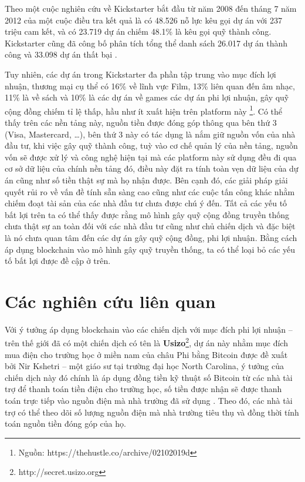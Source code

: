\documentclass[../main-report.tex]{subfiles}
\begin{document}
Theo một cuộc nghiên cứu về Kickstarter bắt đầu từ năm 2008 đến tháng 7 năm 2012 của một cuộc điều tra kết quả là có 48.526 nỗ lực kêu gọi dự án với 237 triệu cam kết, và có 23.719 dự án chiếm 48.1\% là kêu gọi quỹ thành công. Kickstarter cũng đã công bố phân tích tổng thể danh sách 26.017 dự án thành công và 33.098 dự án thất bại \cite{mollick2014dynamics}.

Tuy nhiên, các dự án trong Kickstarter đa phần tập trung vào mục đích lợi nhuận, thương mại cụ thể có 16\% về lĩnh vực Film, 13\% liên quan đến âm nhạc, 11\% là về sách và 10\% là các dự án về games các dự án phi lợi nhuận, gây quỹ cộng đồng chiếm tỉ lệ thấp, hầu như ít xuất hiện trên platform này \footnote{Nguồn: https://thehustle.co/archive/02102019d}. Có thể thấy trên các nền tảng này, nguồn tiền được đóng góp thông qua bên thứ 3 (Visa, Mastercard, \ldots), bên thứ 3 này có tác dụng là nắm giữ nguồn vốn của nhà đầu tư, khi việc gây quỹ thành công, tuỳ vào cơ chế quản lý của nền tảng, nguồn vốn sẽ được xử lý và công nghệ hiện tại mà các platform này sử dụng đều đi qua cơ sở dữ liệu của chính nền tảng đó, điều này đặt ra tính toàn vẹn dữ liệu của dự án cũng như số tiền thật sự mà họ nhận được. Bên cạnh đó, các giải pháp giải quyết rủi ro về vấn đề tính sẵn sàng cao cũng như các cuộc tấn công khác nhằm chiếm đoạt tài sản của các nhà đầu tư chưa được chú ý đến. Tất cả các yếu tố bất lợi trên ta có thể thấy được rằng mô hình gây quỹ cộng đồng truyền thống chưa thật sự an toàn đối với các nhà đầu tư cũng như chủ chiến dịch và đặc biệt là nó chưa quan tâm đến các dự án gây quỹ cộng đồng, phi lợi nhuận. Bằng cách áp dụng blockchain vào mô hình gây quỹ truyền thống, ta có thể loại bỏ các yếu tố bất lợi được đề cập ở trên.
\section{Các nghiên cứu liên quan}
\label{sec:related-work}
Với ý tưởng áp dụng \gls{blockchain} vào các chiến dịch với mục đích phi lợi nhuận – trên thế giới đã có một chiến dịch có tên là \textbf{Usizo}\footnote{http://secret.usizo.org}, dự án này nhằm mục đích mua điện cho trường học ở miền nam của châu Phi bằng Bitcoin  được đề xuất bởi Nir Kshetri – một giáo sư tại trường đại học North Carolina, ý tưởng của chiến dịch này đó chính là áp dụng đồng tiền kỹ thuật số Bitcoin từ các nhà tài trợ để thanh toán tiền điện cho trường học, số tiền được nhận sẽ được thanh toán trực tiếp vào nguồn điện mà nhà trường đã sử dụng \cite{goranovic2017blockchain}. Theo đó, các nhà tài trợ có thể theo dõi số lượng nguồn điện mà nhà trường tiêu thụ và đồng thời tính toán nguồn tiền đóng góp của họ.
\end{document}
